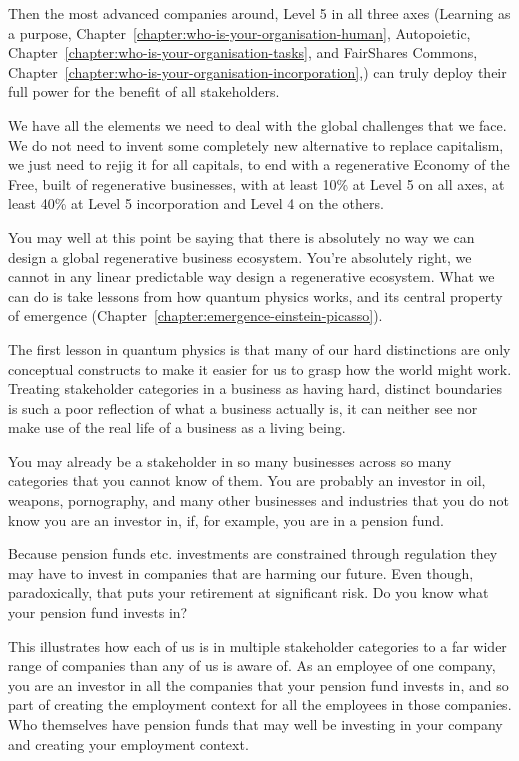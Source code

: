 Then the most advanced companies around, Level 5 in all three axes (Learning as a purpose, Chapter~\ref{chapter:who-is-your-organisation-human}, Autopoietic, Chapter~\ref{chapter:who-is-your-organisation-tasks}, and FairShares Commons, Chapter~\ref{chapter:who-is-your-organisation-incorporation},) can truly deploy their full power for the benefit of all stakeholders.


We have all the elements we need to deal with the global challenges that we face. We do not need to invent some completely new alternative to replace capitalism, we just need to rejig it for all capitals, to end with a regenerative Economy of the Free, built of regenerative businesses, with at least 10\% at Level 5 on all axes, at least 40\% at Level 5 incorporation and Level 4 on the others.


You may well at this point be saying that there is absolutely no way we can design a global regenerative business ecosystem. You're absolutely right, we cannot in any linear predictable way design a regenerative ecosystem. What we can do is take lessons from how quantum physics works, and its central property of emergence (Chapter~\ref{chapter:emergence-einstein-picasso}). 


The first lesson in quantum physics is that many of our hard distinctions are only conceptual constructs to make it easier for us to grasp how the world might work. Treating stakeholder categories in a business as having hard, distinct boundaries is such a poor reflection of what a business actually is, it can neither see nor make use of the real life of a business as a living being.


You may already be a stakeholder in so many businesses across so many categories that you cannot know of them. You are probably an investor in oil, weapons, pornography, and many other businesses and industries that you do not know you are an investor in, if, for example, you are in a pension fund. 


Because pension funds etc. investments are constrained  through regulation they may have to invest in companies that are harming our future. Even though, paradoxically, that puts your retirement at significant risk. Do you know what your pension fund invests in?


This illustrates how each of us is in multiple stakeholder categories to a far wider range of companies than any of us is aware of. As an employee of one company, you are an investor in all the companies that your pension fund invests in, and so part of creating the employment context for all the employees in those companies. Who themselves have pension funds that may well be investing in your company and creating your employment context.


